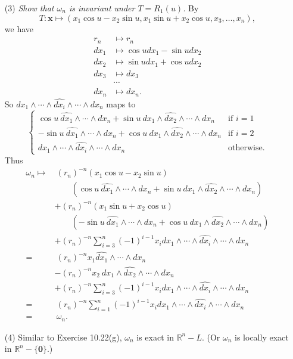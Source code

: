 \documentclass{article}
\begin{document}
\begin{enumerate}
\item[(3)]
  \emph{Show that $\omega_n$ is invariant under $T = R_1(u)$.}
  By
  \[
    T: \mathbf{x} \mapsto (x_1 \cos u - x_2 \sin u, x_1 \sin u + x_2 \cos u, x_3, \ldots, x_n),
  \]
  we have
  \begin{align*}
    r_n &\mapsto r_n \\
    dx_1 &\mapsto \cos u dx_1 - \sin u dx_2 \\
    dx_2 &\mapsto \sin u dx_1 + \cos u dx_2 \\
    dx_3 &\mapsto dx_3 \\
    &\cdots \\
    dx_n &\mapsto dx_n.
  \end{align*}
  So $dx_1 \wedge \cdots \wedge \widehat{dx_i} \wedge \cdots \wedge dx_n$ maps to
  \begin{equation*}
    \begin{cases}
      \cos u \: \widehat{dx_1} \wedge \cdots \wedge dx_n
      + \sin u \: dx_1 \wedge \widehat{dx_2} \wedge \cdots \wedge dx_n
      & \text{if $i = 1$} \\
      -\sin u \: \widehat{dx_1} \wedge \cdots \wedge dx_n
        + \cos u \: dx_1 \wedge \widehat{dx_2} \wedge \cdots \wedge dx_n
      & \text{if $i = 2$} \\
      dx_1 \wedge \cdots \wedge \widehat{dx_i} \wedge \cdots \wedge dx_n
      & \text{otherwise}.
    \end{cases}
  \end{equation*}
  Thus
  \begin{align*}
    \omega_n
    \mapsto& \:
      (r_n)^{-n} (x_1 \cos u - x_2 \sin u) \\
        &\qquad \left(\cos u \: \widehat{dx_1} \wedge \cdots \wedge dx_n
          + \sin u \: dx_1 \wedge \widehat{dx_2} \wedge \cdots \wedge dx_n\right) \\
      & + (r_n)^{-n}(x_1 \sin u + x_2 \cos u) \\
        &\qquad \left(-\sin u \: \widehat{dx_1} \wedge \cdots \wedge dx_n
          + \cos u \: dx_1 \wedge \widehat{dx_2} \wedge \cdots \wedge dx_n\right) \\
      & + (r_n)^{-n}\sum_{i=3}^{n}(-1)^{i-1} x_i
        dx_1 \wedge \cdots \wedge \widehat{dx_i} \wedge \cdots \wedge dx_n \\
    =& \:
      (r_n)^{-n} x_1 \widehat{dx_1} \wedge \cdots \wedge dx_n \\
      & - (r_n)^{-n} x_2 \: dx_1 \wedge \widehat{dx_2} \wedge \cdots \wedge dx_n \\
      & + (r_n)^{-n} \sum_{i=3}^{n}(-1)^{i-1} x_i
        dx_1 \wedge \cdots \wedge \widehat{dx_i} \wedge \cdots \wedge dx_n \\
    =& \:
      (r_n)^{-n} \sum_{i=1}^{n}(-1)^{i-1} x_i
        dx_1 \wedge \cdots \wedge \widehat{dx_i} \wedge \cdots \wedge dx_n \\
    =& \: \omega_n.
  \end{align*}

\item[(4)]
  Similar to Exercise 10.22(g),
  $\omega_n$ is exact in $\mathbb{R}^n - L$.
  (Or $\omega_n$ is locally exact in $\mathbb{R}^n - \{ \mathbf{0} \}$.)
\end{enumerate}
\end{document}
